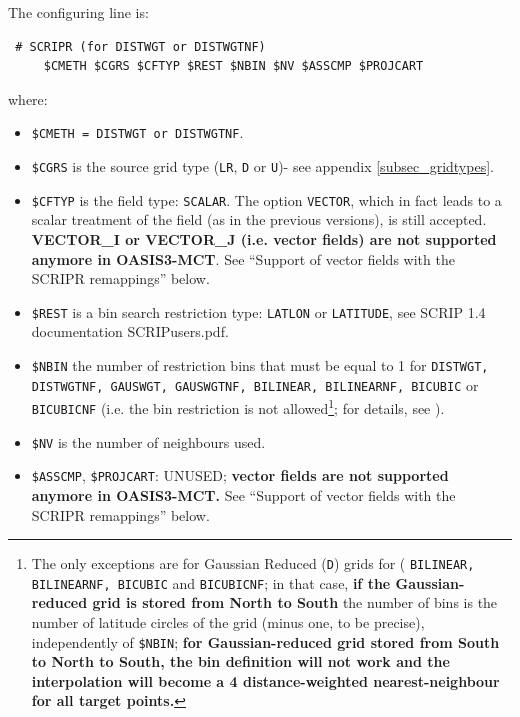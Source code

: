 \begin{itemize}
\begin{itemize}
    The configuring line is:

  \begin{verbatim}
 # SCRIPR (for DISTWGT or DISTWGTNF) 
     $CMETH $CGRS $CFTYP $REST $NBIN $NV $ASSCMP $PROJCART
\end{verbatim} 
    where:
    \begin{itemize}
    \item {\tt \$CMETH = DISTWGT or DISTWGTNF}.
    \item {\tt \$CGRS} is the source grid type ({\tt LR}, {\tt D} or
      {\tt U})- see appendix \ref{subsec_gridtypes}.

    \item {\tt \$CFTYP} is the field type: {\tt SCALAR}. The option
      {\tt VECTOR}, which in fact leads to a scalar treatment of the
      field (as in the previous versions), is still accepted. {\bf
        VECTOR\_I or VECTOR\_J (i.e. vector fields) are not supported
        anymore in OASIS3-MCT}. See ``Support of vector fields with
      the SCRIPR remappings'' below.

    \item {\tt \$REST} is a bin search restriction type: {\tt LATLON} or
      {\tt LATITUDE}, see SCRIP 1.4 documentation SCRIPusers.pdf.
      
    \item {\tt \$NBIN} the number of restriction bins that must be equal to 1 for {\tt DISTWGT, DISTWGTNF, GAUSWGT, GAUSWGTNF, BILINEAR, BILINEARNF, BICUBIC} or {\tt BICUBICNF} (i.e. the
      bin restriction is not allowed\footnote{The only exceptions are for Gaussian Reduced ({\tt D}) grids for ( {\tt BILINEAR, BILINEARNF, BICUBIC} and {\tt BICUBICNF}; in that case, {\bf if the Gaussian-reduced grid is stored from North to South} the number of bins is the number of latitude circles of the grid (minus one, to be precise), independently of {\tt \$NBIN}; {\bf for Gaussian-reduced grid stored from South to North to South, the bin definition will not work and the interpolation will become a 4 distance-weighted nearest-neighbour for all target points.}}; for details, see \newline \citep{piacentini08}).
      
    \item {\tt \$NV} is the number of neighbours used.
    
    \item {\tt \$ASSCMP}, {\tt \$PROJCART}: UNUSED; {\bf vector fields are not supported
        anymore in OASIS3-MCT.} See ``Support of vector fields with
      the SCRIPR remappings'' below.
    \end{itemize}


\end{itemize}
\end{itemize}
